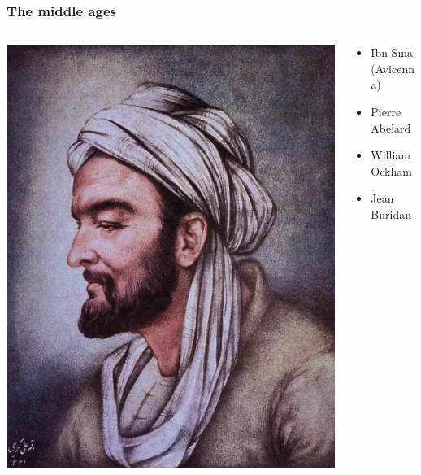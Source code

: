 \begin{frame}
  \frametitle{The middle ages}
  \begin{columns}
    \begin{column}{.5\textwidth}
    \includegraphics[width=\textwidth]{../assets/avicenna}
    \end{column}
    \begin{column}{.5\textwidth}
      \begin{itemize}
        \item Ibn S\=\i n\=a (Avicenna)
        \item Pierre Abelard
        \item William Ockham
        \item Jean Buridan
      \end{itemize}
    \end{column}
  \end{columns}
\end{frame}

